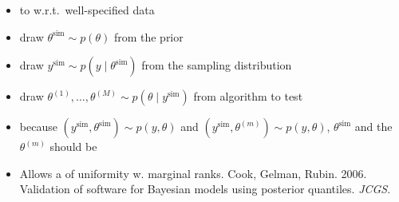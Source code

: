\documentclass[10pt]{report}
\newcommand{\draw}[2]{#1^{(#2)}}
\newcommand{\simvar}[1]{#1^{\textrm{sim}}}
\begin{document}
\begin{itemize}
\item to  w.r.t.\ well-specified data
  \item draw $\simvar{\theta} \sim p(\theta)$ from the prior
  \item draw $\simvar{y} \sim p(y \mid \simvar{\theta})$ from the
    sampling distribution
  \item draw $\draw{\theta}{1}, \ldots, \draw{\theta}{M} \sim p(\theta
    \mid \simvar{y})$ from algorithm to test
  \item because $(\simvar{y}, \simvar{\theta}) \sim p(y, \theta)$ and
    $(\simvar{y}, \draw{\theta}{m}) \sim p(y, \theta)$,
    $\simvar{\theta}$ and the $\draw{\theta}{m}$
    should be 
  \item Allows a  of uniformity w.
    marginal ranks.
    \vfill
    {\footnotesize Cook,  Gelman, Rubin.
      2006. Validation of software for Bayesian models using posterior
      quantiles. \textit{JCGS}.}
\end{itemize}
\end{document}

